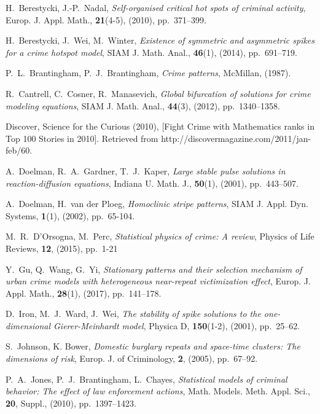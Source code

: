 \documentclass{article}%
\begin{document}
\begin{thebibliography}{99}

 H.~Berestycki, J.-P.~Nadal, \textit{Self-organised
critical hot spots of criminal activity}, Europ. J. Appl. Math.,
\textbf{21}(4-5), (2010), pp.~371--399.

 H.~Berestycki, J.~Wei, M.~Winter, \textit{Existence
of symmetric and asymmetric spikes for a crime hotspot model}, SIAM
J. Math. Anal., \textbf{46}(1), (2014), pp.~691--719.

 P.~L.~Brantingham, P.~J.~Brantingham, \textit{Crime
patterns}, McMillan, (1987).

 R.~Cantrell, C.~Cosner, R.~Manasevich, \textit{Global
  bifurcation of solutions for crime modeling equations}, SIAM
  J. Math. Anal., \textbf{44}(3), (2012), pp.~1340--1358.

 Discover, Science for the Curious (2010), {[}Fight
Crime with Mathematics ranks in Top 100 Stories in 2010{]}. Retrieved
from http://discovermagazine.com/2011/jan-feb/60.

 A.~Doelman, R.~A.~Gardner, T.~J.~Kaper, \textit{Large
  stable pulse solutions in reaction-diffusion equations}, Indiana
  U. Math. J., \textbf{50}(1), (2001), pp.~443--507.

 A.~Doelman, H.~van der Ploeg, \textit{Homoclinic
  stripe patterns}, SIAM J. Appl. Dyn. Systems, \textbf{1}(1), (2002),
  pp.~65-104.

 M.~R.~D'Orsogna, M.~Perc, \textit{Statistical
  physics of crime: A review}, Physics of Life Reviews, \textbf{12},
  (2015), pp.~1-21

 Y.~Gu, Q.~Wang, G.~Yi, \textit{Stationary
patterns and their selection mechanism of urban crime models with
heterogeneous near-repeat victimization effect}, Europ. J. Appl.
Math., {\bf 28}(1), (2017), pp.~141--178.

 D.~Iron, M.~J.~Ward, J.~Wei, \textit{The
stability of spike solutions to the one-dimensional Gierer-Meinhardt
model}, Physica D, \textbf{150}(1-2), (2001), pp.~25--62.

 S.~Johnson, K. Bower, \textit{Domestic burglary
repeats and space-time clusters: The dimensions of risk}, Europ. J.
of Criminology, \textbf{2}, (2005), pp.~67--92.

 P.~A.~Jones, P.~J.~Brantingham, L.~Chayes,
  \textit{Statistical models of criminal behavior: The effect of law
    enforcement actions}, Math. Models. Meth. Appl. Sci., \textbf{20},
  Suppl., (2010), pp.~1397--1423.


\end{thebibliography}
\end{document}
